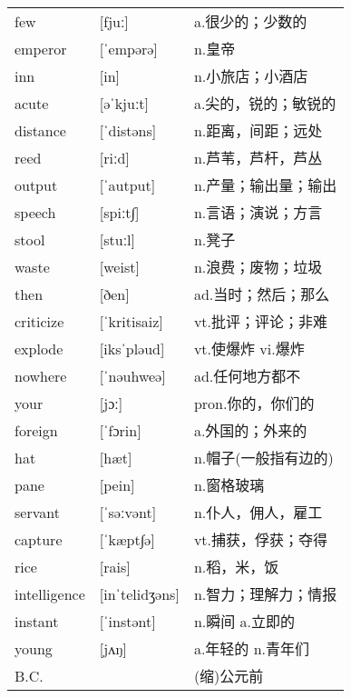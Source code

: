 \documentclass[a4paper]{article}
\begin{document}
\section{}
\begin{tabular}{l l l}

few & [fjuː] & a.很少的；少数的 \\
emperor & [ˈempərə] & n.皇帝 \\
inn & [in] & n.小旅店；小酒店 \\
acute & [əˈkjuːt] & a.尖的，锐的；敏锐的 \\
distance & [ˈdistəns] & n.距离，间距；远处 \\
reed & [riːd] & n.芦苇，芦杆，芦丛 \\
output & [ˈautput] & n.产量；输出量；输出 \\
speech & [spiːt∫] & n.言语；演说；方言 \\
stool & [stuːl] & n.凳子 \\
waste & [weist] & n.浪费；废物；垃圾 \\
then & [ðen] & ad.当时；然后；那么 \\
criticize & [ˈkritisaiz] & vt.批评；评论；非难 \\
explode & [iksˈpləud] & vt.使爆炸 vi.爆炸 \\
nowhere & [ˈnəuhweə] & ad.任何地方都不 \\
your & [jɔː] & pron.你的，你们的 \\
foreign & [ˈfɔrin] & a.外国的；外来的 \\
hat & [hæt] & n.帽子(一般指有边的) \\
pane & [pein] & n.窗格玻璃 \\
servant & [ˈsəːvənt] & n.仆人，佣人，雇工 \\
capture & [ˈkæpt∫ə] & vt.捕获，俘获；夺得 \\
rice & [rais] & n.稻，米，饭 \\
intelligence & [inˈtelidʒəns] & n.智力；理解力；情报 \\
instant & [ˈinstənt] & n.瞬间 a.立即的 \\
young & [jʌŋ] & a.年轻的 n.青年们 \\
B.C. &  & (缩)公元前 \\

\end{tabular}
\end{document}
